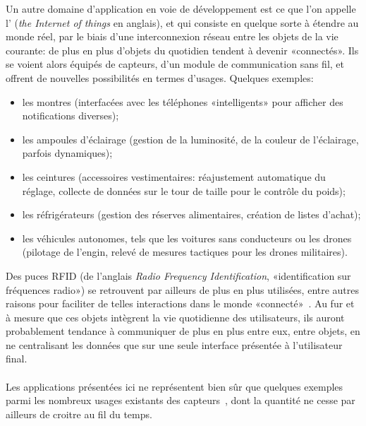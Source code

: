 Un autre domaine d'application en voie de développement est ce que l'on appelle l'\textit{} (\textit{the Internet of things} en anglais), et qui consiste en quelque sorte à étendre  au monde réel, par le biais d'une interconnexion réseau entre les objets de la vie courante: de plus en plus d'objets du quotidien tendent à devenir «connectés».
Ils se voient alors équipés de capteurs, d'un module de communication sans fil, et offrent de nouvelles possibilités en termes d'usages.
Quelques exemples:
\begin{itemize}
    \item les montres (interfacées avec les téléphones «intelligents» pour afficher des notifications diverses);
    \item les ampoules d'éclairage (gestion de la luminosité, de la couleur de l'éclairage, parfois dynamiques);
    \item les ceintures (accessoires vestimentaires: réajustement automatique du réglage, collecte de données sur le tour de taille pour le contrôle du poids);
    \item les réfrigérateurs (gestion des réserves alimentaires, création de listes d'achat);
    \item les véhicules autonomes, tels que les voitures sans conducteurs ou les drones (pilotage de l'engin, relevé de mesures tactiques pour les drones militaires).
\end{itemize}
Des puces RFID (de l'anglais \textit{Radio Frequency Identification}, «identification sur fréquences radio») se retrouvent par ailleurs de plus en plus utilisées, entre autres raisons pour faciliter de telles interactions dans le monde «connecté»~\cite{TW10}.
Au fur et à mesure que ces objets intègrent la vie quotidienne des utilisateurs, ils auront probablement tendance à communiquer de plus en plus entre eux, entre objets, en ne centralisant les données que sur une seule interface présentée à l'utilisateur final.

        \paragraph{}
Les applications présentées ici ne représentent bien sûr que quelques exemples parmi les nombreux usages existants des capteurs~\cite{ASSC02}, dont la quantité ne cesse par ailleurs de croitre au fil du temps.


